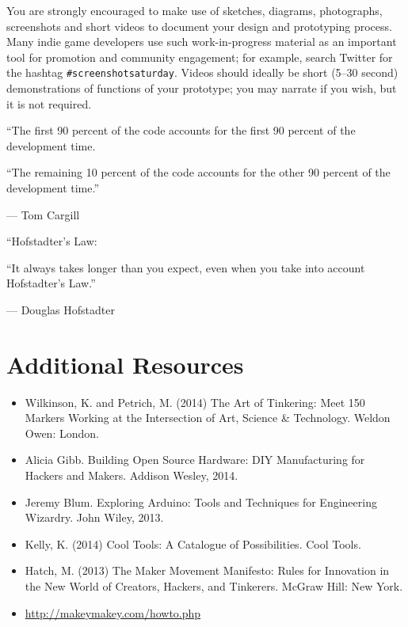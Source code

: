 \documentclass{../fal_assignment}
\begin{document}
You are strongly encouraged to make use of sketches, diagrams, photographs, screenshots
and short videos to document your design and prototyping process.
Many indie game developers use such work-in-progress material as an important tool for promotion
and community engagement; for example, search Twitter for the hashtag \texttt{\#screenshotsaturday}.
Videos should ideally be short (5--30 second) demonstrations of functions of your prototype;
you may narrate if you wish, but it is not required.

\begin{marginquote}
    ``The first 90 percent of the code accounts for the first 90 percent of the development time.
    
    ``The remaining 10 percent of the code accounts for the other 90 percent of the development time.''
    
    --- Tom Cargill
    
    \marginquoterule
    
    ``Hofstadter's Law:
    
    ``It always takes longer than you expect, even when you take into account Hofstadter's Law.''
    
    --- Douglas Hofstadter
\end{marginquote}
\section*{Additional Resources}

\begin{itemize}
    \item Wilkinson, K. and Petrich, M. (2014) The Art of Tinkering: Meet 150 Markers Working at the Intersection of Art, Science \& Technology. Weldon Owen: London.
    \item Alicia Gibb. Building Open Source Hardware: DIY Manufacturing for Hackers and Makers. Addison Wesley, 2014. 
    \item Jeremy Blum. Exploring Arduino: Tools and Techniques for Engineering Wizardry. John Wiley, 2013. 
    \item Kelly, K. (2014) Cool Tools: A Catalogue of Possibilities. Cool Tools.
    \item Hatch, M. (2013) The Maker Movement Manifesto: Rules for Innovation in the New World of Creators, Hackers, and Tinkerers. McGraw Hill: New York.
    \item \url{http://makeymakey.com/howto.php}
\end{itemize}
\end{document}
